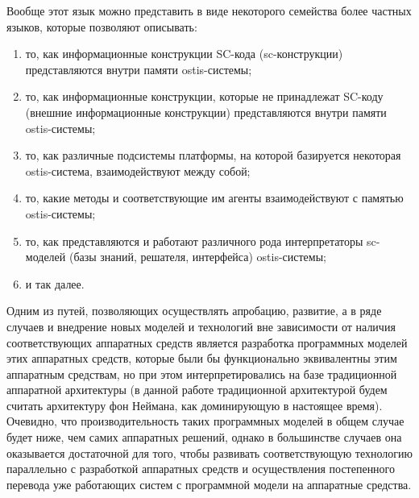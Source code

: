 Вообще этот язык можно представить в виде некоторого семейства более частных языков, которые позволяют описывать:
\begin{enumerate}
    \item то, как информационные конструкции SC-кода (sc-конструкции) представляются внутри памяти ostis-системы;
    \item то, как информационные конструкции, которые не принадлежат SC-коду (внешние информационные конструкции) представляются внутри памяти ostis-системы;
    \item то, как различные подсистемы платформы, на которой базируется некоторая ostis-система, взаимодействуют между собой;
    \item то, какие методы и соответствующие им агенты взаимодействуют с памятью ostis-системы;
    \item то, как представляются и работают различного рода интерпретаторы sc-моделей (базы знаний, решателя, интерфейса) ostis-системы;
    \item и так далее.
\end{enumerate}

Одним из путей, позволяющих осуществлять апробацию, развитие, а в ряде случаев и внедрение новых моделей и технологий
вне зависимости от наличия соответствующих аппаратных средств является разработка программных моделей этих аппаратных
средств, которые были бы функционально эквивалентны этим аппаратным средствам, но при этом интерпретировались на базе
традиционной аппаратной архитектуры (в данной работе традиционной архитектурой будем считать архитектуру фон Неймана,
как доминирующую в настоящее время). Очевидно, что производительность таких программных моделей в общем случае будет
ниже, чем самих аппаратных решений, однако в большинстве случаев она оказывается достаточной для того, чтобы развивать
соответствующую технологию параллельно с разработкой аппаратных средств и осуществления постепенного перевода уже
работающих систем с программной модели на аппаратные средства.

